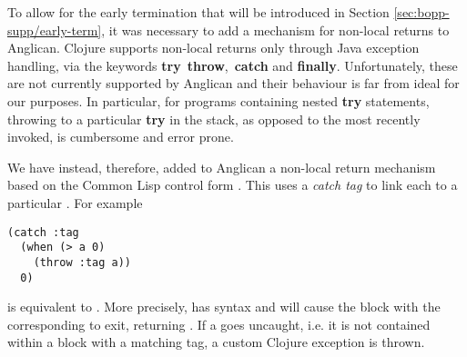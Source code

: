 To allow for the early termination that will be introduced in Section \ref{sec:bopp-supp/early-term}, it was necessary to add a mechanism for non-local returns to Anglican.  Clojure supports non-local returns only through Java exception handling, via the keywords {\bf\ttfamily\color{cyan} try}~{\bf\ttfamily\color{cyan}throw},~{\bf\ttfamily\color{cyan}catch} and {\bf\ttfamily\color{cyan}finally}.  Unfortunately, these are not currently supported by Anglican and their behaviour is far from ideal for our purposes.  In particular, for programs containing nested {\bf\ttfamily\color{cyan}try} statements, throwing to a particular {\bf\ttfamily\color{cyan}try} in the stack, as opposed to the most recently invoked, is cumbersome and error prone.
%

We have instead, therefore, added to Anglican a non-local return mechanism based on the Common Lisp control form .  This uses a \emph{catch tag} to link each  to a particular .  For example
\begin{lstlisting}[basicstyle=\footnotesize\ttfamily]
(catch :tag
  (when (> a 0)
    (throw :tag a))
  0)
\end{lstlisting}
is equivalent to .  More precisely,  has syntax  and will cause the  block with the corresponding  to exit, returning .   If a  goes uncaught, i.e. it is not contained within a  block with a matching tag, a custom Clojure exception is thrown.


